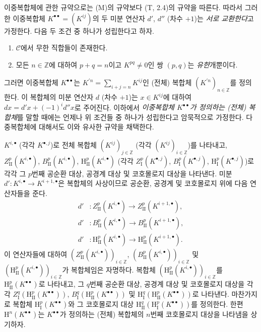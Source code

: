 \begin{env}[11.3.1]
\label{0.11.3.1-fr}
이중복합체에 관한 규약으로는 (M)의 규약보다 (T, 2.4)의 규약을 따른다.
따라서 그러한 이중복합체 $K^{\bullet\bullet}=(K^{ij})$의 두 미분 연산자
$d'$, $d''$ (차수 $+1$)는 \emph{서로 교환한다}고 가정한다. 다음 두 조건
중 하나가 성립한다고 하자.
\begin{enumerate}
  \item[$1^\circ$] $\mathcal C$에서 무한 직합들이 존재한다.
  \item[$2^\circ$] 모든 $n\in\mathbb Z$에 대하여 $p+q=n$이고
    $K^{pq}\ne0$인 쌍 $(p,q)$는 \emph{유한}개뿐이다.
\end{enumerate}
그러면 이중복합체 $K^{\bullet\bullet}$는
$K^{\prime n}=\sum_{i+j=n}K^{ij}$인 (전체) 복합체
$(K^{\prime n})_{n\in\mathbb Z}$를 정의한다. 이 복합체의 미분 연산자
$d$ (차수 $+1$)는 $x\in K^{ij}$에 대하여
$dx=d'x+(-1)^i d''x$로 주어진다. 이하에서 \emph{이중복합체
$K^{\bullet\bullet}$가 정의하는 (전체) 복합체}를 말할 때에는 언제나 위
조건들 중 하나가 성립한다고 암묵적으로 가정한다. 다중복합체에 대해서도
이와 유사한 규약을 채택한다.

$K^{i,\bullet}$ (각각 $K^{\bullet,j}$)로 전체 복합체
$(K^{ij})_{j\in\mathbb Z}$ (각각 $(K^{ij})_{i\in\mathbb Z}$)를 나타내고,
$Z_{\mathrm{II}}^p(K^{i,\bullet})$, $B_{\mathrm{II}}^p(K^{i,\bullet})$,
$\mathrm H_{\mathrm{II}}^p(K^{i,\bullet})$ (각각
$Z_{\mathrm I}^p(K^{\bullet,j})$, $B_{\mathrm I}^p(K^{\bullet,j})$,
$\mathrm H_{\mathrm I}^p(K^{\bullet,j})$)로 각각 그 $p$번째 공순환 대상,
공경계 대상 및 코호몰로지 대상을 나타낸다. 미분
$d':K^{i,\bullet}\to K^{i+1,\bullet}$은 복합체의 사상이므로 공순환,
공경계 및 코호몰로지 위에 다음 연산자들을 준다.
\[
\begin{aligned}
  d'&:Z_{\mathrm{II}}^p(K^{i,\bullet})
      \longrightarrow Z_{\mathrm{II}}^p(K^{i+1,\bullet}),\\
  d'&:B_{\mathrm{II}}^p(K^{i,\bullet})
      \longrightarrow B_{\mathrm{II}}^p(K^{i+1,\bullet}),\\
  d'&:\mathrm H_{\mathrm{II}}^p(K^{i,\bullet})
      \longrightarrow \mathrm H_{\mathrm{II}}^p(K^{i+1,\bullet}).
\end{aligned}
\]
이 연산자들에 대하여
$(Z_{\mathrm{II}}^p(K^{i,\bullet}))_{i\in\mathbb Z}$,
$(B_{\mathrm{II}}^p(K^{i,\bullet}))_{i\in\mathbb Z}$ 및
$(\mathrm H_{\mathrm{II}}^p(K^{i,\bullet}))_{i\in\mathbb Z}$가
복합체임은 자명하다. 복합체
$(\mathrm H_{\mathrm{II}}^p(K^{i,\bullet}))_{i\in\mathbb Z}$를
$\mathrm H_{\mathrm{II}}^p(K^{\bullet\bullet})$로 나타내고, 그 $q$번째
공순환 대상, 공경계 대상 및 코호몰로지 대상을 각각
$Z_{\mathrm I}^q(\mathrm H_{\mathrm{II}}^p(K^{\bullet\bullet}))$,
$B_{\mathrm I}^q(\mathrm H_{\mathrm{II}}^p(K^{\bullet\bullet}))$ 및
$\mathrm H_{\mathrm I}^q(\mathrm H_{\mathrm{II}}^p(K^{\bullet\bullet}))$로
나타낸다. 마찬가지로 복합체
$\mathrm H_{\mathrm I}^p(K^{\bullet\bullet})$와 그 코호몰로지 대상
$\mathrm H_{\mathrm{II}}^q(\mathrm H_{\mathrm I}^p(K^{\bullet\bullet}))$를
정의한다. 한편 $\mathrm H^n(K^{\bullet\bullet})$는
$K^{\bullet\bullet}$가 정의하는 (전체) 복합체의 $n$번째 코호몰로지
대상을 나타냄을 상기하자.
\end{env}

